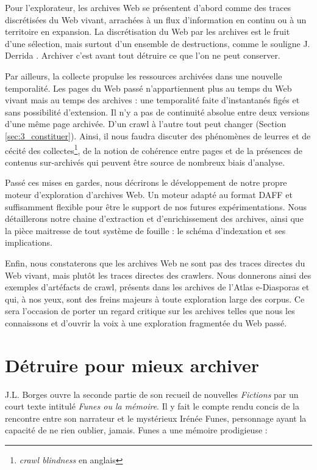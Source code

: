 \documentclass[symmetric,justified,marginals=raggedouter]{tufte-book}
\begin{document}
Pour l'explorateur, les archives Web se présentent d'abord comme des traces discrétisées du Web vivant, arrachées à un flux d'information en continu ou à un territoire en expansion. La discrétisation du Web par les archives est le fruit d'une sélection, mais surtout d'un ensemble de destructions, comme le souligne J. Derrida \citep[p.60]{derrida_trace_2014}. Archiver c'est avant tout détruire ce que l'on ne peut conserver.

Par ailleurs, la collecte propulse les ressources archivées dans une nouvelle temporalité. Les pages du Web passé n'appartiennent plus au temps du Web vivant mais au temps des archives : une temporalité faite d'instantanés figés et sans possibilité d'extension. Il n'y a pas de continuité absolue entre deux versions d'une même page archivée. D'un crawl à l'autre tout peut changer (Section \ref{sec:3_constituer}). Ainsi, il nous faudra discuter des phénomènes de leurres et de cécité des collectes\footnote{\textit{crawl blindness} en anglais}, de la notion de cohérence entre pages et de la présences de contenus sur-archivés qui peuvent être source de nombreux biais d'analyse. 

Passé ces mises en gardes, nous décrirons le développement de notre propre moteur d'exploration d'archives Web. Un moteur adapté au format DAFF et suffisamment flexible pour être le support de nos futures expérimentations. Nous détaillerons notre chaine d'extraction et d'enrichissement des archives, ainsi que la pièce maitresse de tout système de fouille : le schéma d'indexation et ses implications. 

Enfin, nous constaterons que les archives Web ne sont pas des traces directes du Web vivant, mais plutôt les traces directes des crawlers. Nous donnerons ainsi des exemples d'artéfacts de crawl, présents dans les archives de l'Atlas e-Diasporas et qui, à nos yeux, sont des freins majeurs à toute exploration large des corpus. Ce sera l'occasion de porter un regard critique sur les archives telles que nous les connaissons et d'ouvrir la voix à une exploration fragmentée du Web passé.\\


\section{Détruire pour mieux archiver}
\label{sec:4_derrida}

\noindent J.L. Borges ouvre la seconde partie de son recueil de nouvelles \textit{Fictions} \citep{borges_fictions_1974} par un court texte intitulé \textit{Funes ou la mémoire}. Il y fait le compte rendu concis de la rencontre entre son narrateur et le mystérieux Irénée Funes, personnage ayant la capacité de ne rien oublier, jamais. Funes a une mémoire prodigieuse : \\
\end{document}

